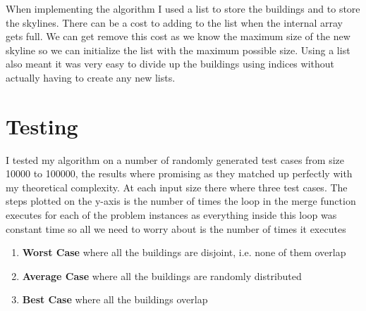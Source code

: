 \documentclass{article}
\begin{document}
		When implementing the algorithm I used a list to store the buildings and to store the skylines. There can be a cost to adding to the list when the internal array gets full. We can get remove this cost as we know the maximum size of the new skyline so we can initialize the list with the maximum possible size. Using a list also meant it was very easy to divide up the buildings using indices without actually having to create any new lists.
		
	\break		
		
	\section{Testing}
	
		I tested my algorithm on a number of randomly generated test cases from size 10000 to 100000, the results where promising as they matched up perfectly with my theoretical complexity. At each input size there where three test cases. The steps plotted on the y-axis is the number of times the loop in the merge function executes for each of the problem instances as everything inside this loop was constant time so all we need to worry about is the number of times it executes\newline\newline

		\begin{enumerate}
			\item \textbf{Worst Case} where all the buildings are disjoint, i.e. none of them overlap
			\item \textbf{Average Case} where all the buildings are randomly distributed 
			\item \textbf{Best Case} where all the buildings overlap
		\end{enumerate}
		
\end{document}
